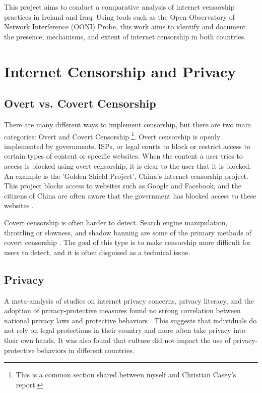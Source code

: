 This project aims to conduct a comparative analysis of internet censorship practices in Ireland and Iraq. Using tools such as the Open Observatory of Network Interference (OONI) Probe, this work aims to identify and document the presence, mechanisms, and extent of internet censorship in both countries.

\section{Internet Censorship and Privacy}

\subsection{Overt vs. Covert Censorship}
\label{sec:Chris-Overt-Covert}

There are many different ways to implement censorship, but there are two main categories: Overt and Covert Censorship \cite{OvertVsCovert}\footnote{This is a common section shared between myself and Christian Casey’s report.}. Overt censorship is openly implemented by governments, ISPs, or legal courts to block or restrict access to certain types of content or specific websites. When the content a user tries to access is blocked using overt censorship, it is clear to the user that it is blocked. An example is the 'Golden Shield Project', China's internet censorship project. This project blocks access to websites such as Google and Facebook, and the citizens of China are often aware that the government has blocked access to these websites \cite{standfordGreatFirewallOfChina}.

Covert censorship is often harder to detect. Search engine manipulation, throttling or slowness, and shadow banning are some of the primary methods of covert censorship \cite{OvertVsCovert}. The goal of this type is to make censorship more difficult for users to detect, and it is often disguised as a technical issue.

\subsection{Privacy} 

A meta-analysis of studies on internet privacy concerns, privacy literacy, and the adoption of privacy-protective measures found no strong correlation between national privacy laws and protective behaviors \cite{baruh2017online}. This suggests that individuals do not rely on legal protections in their country and more often take privacy into their own hands. It was also found that culture did not impact the use of privacy-protective behaviors in different countries. 

